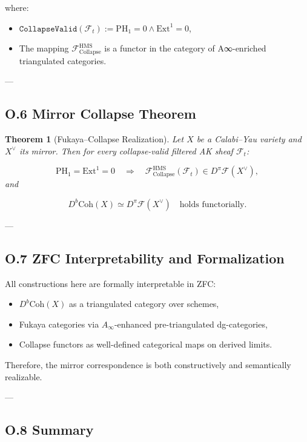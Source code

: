 \documentclass[11pt]{article}
\newtheorem{theorem}{Theorem}[section]
\begin{document}
where:
\begin{itemize}
  \item $\texttt{CollapseValid}(\mathcal{F}_t) := \mathrm{PH}_1 = 0 \wedge \mathrm{Ext}^1 = 0$,
  \item The mapping $\mathcal{F}_{\mathrm{Collapse}}^{\mathrm{HMS}}$ is a functor in the category of A∞-enriched triangulated categories.
\end{itemize}

---

\subsection*{O.6 Mirror Collapse Theorem}

\begin{theorem}[Fukaya–Collapse Realization]
Let $X$ be a Calabi–Yau variety and $X^\vee$ its mirror. Then for every collapse-valid filtered AK sheaf $\mathcal{F}_t$:

\[
\mathrm{PH}_1 = \mathrm{Ext}^1 = 0
\quad \Rightarrow \quad
\mathcal{F}_{\mathrm{Collapse}}^{\mathrm{HMS}}(\mathcal{F}_t) \in D^\pi\mathcal{F}(X^\vee),
\]
and

\[
D^b\mathrm{Coh}(X) \simeq D^\pi\mathcal{F}(X^\vee)
\quad \text{holds functorially}.
\]
\end{theorem}

---

\subsection*{O.7 ZFC Interpretability and Formalization}

All constructions here are formally interpretable in ZFC:

\begin{itemize}
  \item $D^b\mathrm{Coh}(X)$ as a triangulated category over schemes,
  \item Fukaya categories via $A_\infty$-enhanced pre-triangulated dg-categories,
  \item Collapse functors as well-defined categorical maps on derived limits.
\end{itemize}

Therefore, the mirror correspondence is both constructively and semantically realizable.

---

\subsection*{O.8 Summary}
\end{document}
